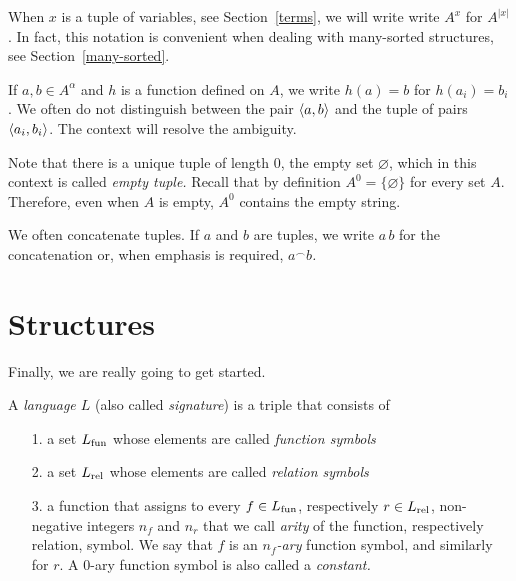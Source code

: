 When $x$ is a tuple of variables, see Section~\ref{terms}, we will write write \emph{$A^{x}$\/} for $A^{|x|}$.
In fact, this notation is convenient when dealing with many-sorted structures, see Section~\ref{many-sorted}.

If $a,b\in A^{\alpha}$ and $h$ is a function defined on $A$, we write $h(a)=b$ for $h(a_i)=b_i$.
We often do not distinguish between the pair $\langle a,b\rangle$ and the tuple of pairs $\langle a_i,b_i\rangle$.
The context will resolve the ambiguity.

Note that there is a unique tuple of length $0$, the empty set $\varnothing$, which in this context is called \emph{empty tuple.}
Recall that by definition \emph{$A^{0}$\/}$=\{\varnothing\}$ for every set $A$.
Therefore, even when $A$ is empty, $A^{0}$ contains the empty string.

We often concatenate tuples.
If $a$ and $b$ are tuples, we write \emph{$a\,b$\/} for the concatenation or, when emphasis is required, \emph{$a^\frown b$.}

\section{Structures}
Finally, we are really going to get started.

\begin{definition}
A \emph{language $L$\/} (also called \emph{signature\/}) is a triple that consists of
\begin{itemize}
\item[1.] a set \emph{$L_{\rm fun}$} whose elements are called \emph{function symbols}
\item[2.] a set \emph{$L_{\rm rel}$\/} whose elements are called \emph{relation symbols}
\item[3.] a function that assigns to every $f\in L_{\rm fun}$, respectively $r\in L_{\rm rel}$, non-negative integers $n_f$ and $n_r$ that we call \emph{arity\/} of the function, respectively relation, symbol.
We say that $f$ is an \emph{$n_f$-ary} function symbol, and similarly for $r$.
A $0$-ary function symbol is also called a \emph{constant.}
\end{itemize}
\end{definition}


